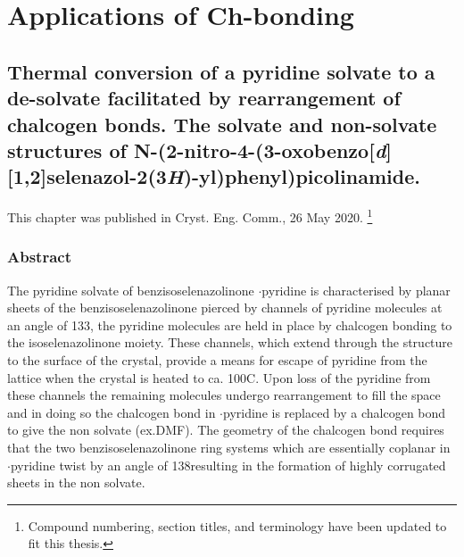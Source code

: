 \part{Applications of Ch-bonding}

\begin{refsection}

\chapter[Thermal rearrangement of a Ch-bonded solvate]{Thermal conversion of a pyridine solvate to a de-solvate facilitated by rearrangement of chalcogen bonds. The solvate and non-solvate structures of N-(2-nitro-4-(3-oxobenzo[\emph{d}][1,2]selenazol-2(3\emph{H})-yl)phenyl)picolinamide.}

This chapter was published in Cryst. Eng. Comm., 26 May 2020\autocite{Fellowes2020a}. \footnote{Compound numbering, section titles, and terminology have been updated to fit this thesis.}

\section{Abstract}
The pyridine solvate of benzisoselenazolinone $\cdot$pyridine is characterised by planar sheets of the benzisoselenazolinone  pierced by channels of pyridine molecules at an angle of 133\degree, the pyridine molecules are held in place by  chalcogen bonding to the isoselenazolinone moiety.
These channels, which extend through the structure to the surface of the crystal, provide a means for escape of pyridine from the lattice when the crystal is heated to ca. 100\degree C. 
Upon loss of the pyridine from these channels the remaining molecules undergo rearrangement to fill the space and in doing so the  chalcogen bond in $\cdot$pyridine is replaced by a  chalcogen bond to give the non solvate (ex.DMF). 
The geometry of the chalcogen bond requires that the two benzisoselenazolinone ring systems which are essentially coplanar in $\cdot$pyridine twist by an angle of 138\degree resulting in the formation of highly corrugated sheets in the non solvate.


\end{refsection}
